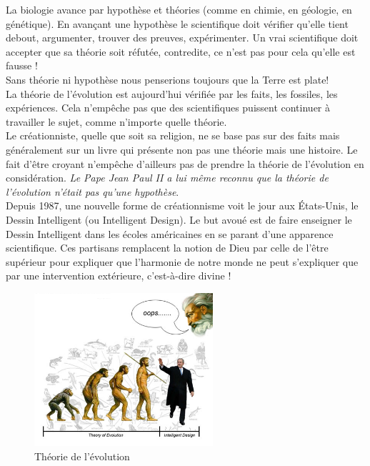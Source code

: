 La biologie avance par hypothèse et théories (comme en chimie, en géologie, en 
génétique). En avançant une hypothèse le scientifique doit vérifier qu'elle 
tient debout, argumenter, trouver des preuves, expérimenter. Un vrai 
scientifique doit accepter que sa théorie soit réfutée, contredite, 
ce n'est pas pour cela qu'elle est fausse ! \\
Sans théorie ni hypothèse nous penserions toujours que la Terre est plate!\\
La théorie de l'évolution est aujourd'hui vérifiée par les faits, les fossiles, 
les expériences. Cela n'empêche pas que des scientifiques puissent continuer 
à travailler le sujet, comme n'importe quelle théorie. \\
Le créationniste, quelle que soit sa religion, ne se base pas sur des faits mais
généralement sur un livre qui présente non pas une théorie mais une histoire. 
Le fait d'être croyant n'empêche d'ailleurs pas de prendre la théorie de 
l'évolution en considération. \textit{Le Pape Jean Paul II a lui même reconnu 
	que la théorie de l'évolution n'était pas qu'une hypothèse}.\\

Depuis 1987, une nouvelle forme de créationnisme voit le jour aux États-Unis, le 
Dessin Intelligent (ou Intelligent Design). Le but avoué est de faire enseigner
le Dessin Intelligent dans les écoles américaines en se parant d'une apparence 
scientifique. Ces partisans remplacent la notion de Dieu par celle de l'être 
supérieur pour expliquer que l'harmonie de notre monde ne peut s'expliquer que 
par une intervention extérieure, c'est-à-dire divine !	
	\begin{figure}[h]
		\begin{center}
	\includegraphics[width=250px]{img10.png}
	\caption{Théorie de l'évolution}
		\end{center}
	\end{figure}	
	
